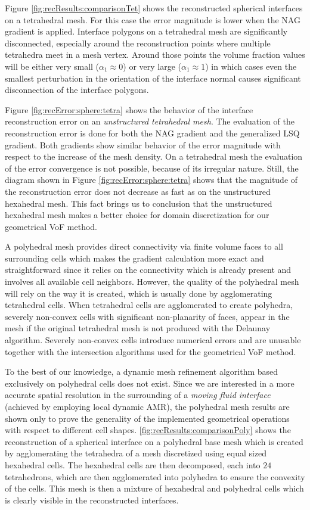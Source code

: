 Figure \ref{fig:recResults:comparisonTet} shows the reconstructed spherical
interfaces on a tetrahedral mesh. For this case the error magnitude is lower
when the NAG gradient is applied. Interface polygons on a tetrahedral mesh are
significantly disconnected, especially around the reconstruction points where
multiple tetrahedra meet in a mesh vertex. Around those points the volume
fraction values will be either very small ($\alpha_1 \approx 0$) or very large
($\alpha_1 \approx 1$) in which cases even the smallest perturbation in the
orientation of the interface normal causes significant disconnection of the
interface polygons. 

Figure \ref{fig:recError:sphere:tetra} shows the behavior of the interface
reconstruction error on an \emph{unstructured tetrahedral mesh}. The evaluation
of the reconstruction error is done for both the NAG gradient and the
generalized LSQ gradient. Both gradients show similar behavior of the error
magnitude with respect to the increase of the mesh density. On a tetrahedral
mesh the evaluation of the error convergence is not possible, because of its
irregular nature. Still, the diagram shown in Figure
\ref{fig:recError:sphere:tetra} shows that the magnitude of the reconstruction
error does not decrease as fast as on the unstructured hexahedral mesh. This
fact brings us to conclusion that the unstructured hexahedral mesh makes a
better choice for domain discretization for our geometrical VoF method. 

A polyhedral mesh provides direct connectivity via finite volume faces to all
surrounding cells which makes the gradient calculation more exact and
straightforward since it relies on the connectivity which is already present
and involves all available cell neighbors. However, the quality of the
polyhedral mesh will rely on the way it is created, which is usually done by
agglomerating tetrahedral cells. When tetrahedral cells are agglomerated to
create polyhedra, severely non-convex cells with significant non-planarity of
faces, appear in the mesh if the original tetrahedral mesh is not produced with
the Delaunay algorithm. Severely non-convex cells introduce numerical errors
and are unusable together with the intersection algorithms used for the
geometrical VoF method.

To the best of our knowledge, a dynamic mesh refinement algorithm based
exclusively on polyhedral cells does not exist. Since we are interested in a
more accurate spatial resolution in the surrounding of a \emph{moving fluid
interface} (achieved by employing local dynamic AMR), the polyhedral mesh
results are shown only to prove the generality of the implemented geometrical
operations with respect to different cell shapes. %
\ref{fig:recResults:comparisonPoly} shows the reconstruction of a spherical
interface on a polyhedral base mesh which is created by agglomerating the
tetrahedra of a mesh discretized using equal sized hexahedral cells. The
hexahedral cells are then decomposed, each into $24$ tetrahedrons, which are
then agglomerated into polyhedra to ensure the convexity of the cells. This
mesh is then a mixture of hexahedral and polyhedral cells which is clearly
visible in the reconstructed interfaces. 

